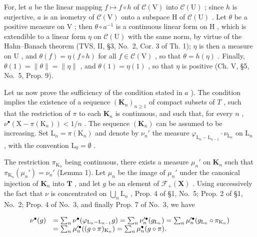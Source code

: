 For, let \(a\) be the linear mapping \(f \mapsto f \circ h\) of \(\mathcal{C}(\mathrm{V})\) into \(\mathcal{C}(\mathrm{U})\) ; since \(h\) is surjective, \(a\) is an isometry of \(\mathcal{C}(\mathrm{V})\) onto a subspace \(\mathrm{H}\) of \(\mathcal{C}(\mathrm{U})\) . Let \(\theta\) be a positive measure on \(\mathrm{V}\) ; then \(\theta \circ a^{-1}\) is a continuous linear form on \(\mathrm{H}\) , which is extendible to a linear form \(\eta\) on \(\mathcal{C}(\mathrm{U})\) with the same norm, by virtue of the Hahn--Banach theorem (TVS, II, §3, No.~2, Cor. 3 of Th. 1); \(\eta\) is then a measure on \(\mathrm{U}\) , and \(\theta(f) = \eta(f \circ h)\) for all \(f \in \mathcal{C}(\mathrm{V})\) , so that \(\theta = h(\eta)\) . Finally, \(\theta(1) = \| \theta \| = \| \eta \|\) , and \(\theta(1) = \eta(1)\) , so that \(\eta\) is positive (Ch. V, §5, No.~5, Prop. 9).

Let us now prove the sufficiency of the condition stated in \(a\) ). The condition implies the existence of a sequence \((\mathbf{K}_n)_{n \geqslant 1}\) of compact subsets of \(T\) , such that the restriction of \(\pi\) to each \(\mathbf{K}_n\) is continuous, and such that, for every \(n\) , \(\nu^{\bullet}(\mathrm{X} - \pi(\mathrm{K}_n)) < 1/n\) . The sequence \((\mathbf{K}_n)\) can be assumed to be increasing. Set \(\mathrm{L}_n = \pi(\mathrm{K}_n)\) and denote by \(\nu_n'\) the measure \(\varphi_{\mathrm{L}_n - \mathrm{L}_{n-1}} \cdot \nu_{\mathrm{L}_n}\) on \(\mathrm{L}_n\) , with the convention \(\mathrm{L}_0 = \emptyset\) .

The restriction \(\pi_{\mathrm{K}_n}\) being continuous, there exists a measure \(\mu_n'\) on \(\mathbf{K}_n\) such that \(\pi_{\mathrm{K}_n}(\mu_n') = \nu_n'\) (Lemma 1). Let \(\mu_n\) be the image of \(\mu_n'\) under the canonical injection of \(\mathbf{K}_n\) into \(\mathbf{T}\) , and let \(g\) be an element of \(\mathcal{F}_{+}(\mathbf{X})\) . Using successively the fact that \(\nu\) is concentrated on \(\bigcup_{n} \mathrm{L}_n\) , Prop. 4 of §1, No.~5; Prop. 2 of §1, No.~2; Prop. 4 of No.~3, and finally Prop. 7 of No.~3, we have

\[
\begin{array}{r l} \nu^ {\bullet} (g) & = \sum_ {n} \nu^ {\bullet} (\varphi_ {\mathrm{L} _ {n} - \mathrm{L} _ {n - 1}} g) = \sum_ {n} \nu_ {n} ^ {\prime   \bullet} (g _ {\mathrm{L} _ {n}}) = \sum_ {n} \mu_ {n} ^ {\prime   \bullet} (g _ {\mathrm{L} _ {n}} \circ \pi_ {\mathrm{K} _ {n}}) \\ & = \sum_ {n} \mu_ {n} ^ {\prime   \bullet} ((g \circ \pi) _ {\mathrm{K} _ {n}}) = \sum_ {n} \mu_ {n} ^ {\bullet} (g \circ \pi). \end{array}
\]

